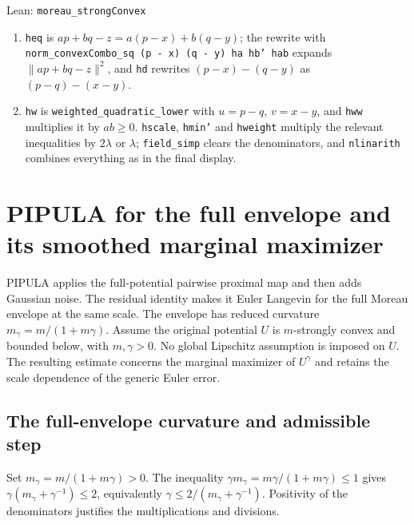 \documentclass[11pt,a4paper]{report}
\begin{document}
\begin{leanbox}{Lean: \texttt{moreau\_\allowbreak{}strongConvex}}
\begin{enumerate}
\item \texttt{heq} is \(ap+bq-z=a(p-x)+b(q-y)\); the rewrite with \texttt{norm\_\allowbreak{}convex\allowbreak{}Combo\_\allowbreak{}sq (p -\allowbreak{} x) (q -\allowbreak{} y) ha hb' hab} expands \(\|ap+bq-z\|^2\), and \texttt{hd} rewrites \((p-x)-(q-y)\) as \((p-q)-(x-y)\).

\item \texttt{hw} is \texttt{weighted\_\allowbreak{}quadratic\_\allowbreak{}lower} with \(u=p-q\), \(v=x-y\), and \texttt{hww} multiplies it by \(ab\ge0\). \texttt{hscale}, \texttt{hmin'} and \texttt{hweight} multiply the relevant inequalities by \(2\lambda\) or \(\lambda\); \texttt{field\_\allowbreak{}simp} clears the denominators, and \texttt{nlinarith} combines everything as in the final display.

\end{enumerate}
\end{leanbox}
\section{\texorpdfstring{PIPULA for the full envelope and its smoothed marginal maximizer}{PIPULA for the full envelope and its smoothed marginal maximizer}}
\label{proof-module-ProximalLangevin-PIPULA-lean}


PIPULA applies the full-potential pairwise proximal map and then adds Gaussian noise. The residual identity makes it Euler Langevin for the full Moreau envelope at the same scale. The envelope has reduced curvature \(m_\gamma=m/(1+m\gamma)\). Assume the original potential \(U\) is \(m\)-strongly convex and bounded below, with \(m,\gamma>0\). No global Lipschitz assumption is imposed on \(U\). The resulting estimate concerns the marginal maximizer of \(U^\gamma\) and retains the scale dependence of the generic Euler error.

\subsection{\texorpdfstring{The full-envelope curvature and admissible step}{The full-envelope curvature and admissible step}}
\label{report-step-ProximalLangevin-PIPULA-lean-1}


Set \(m_\gamma=m/(1+m\gamma)>0\). The inequality \(\gamma m_\gamma=m\gamma/(1+m\gamma)\le1\) gives \(\gamma(m_\gamma+\gamma^{-1})\le2\), equivalently \(\gamma\le2/(m_\gamma+\gamma^{-1})\). Positivity of the denominators justifies the multiplications and divisions.
\end{document}
